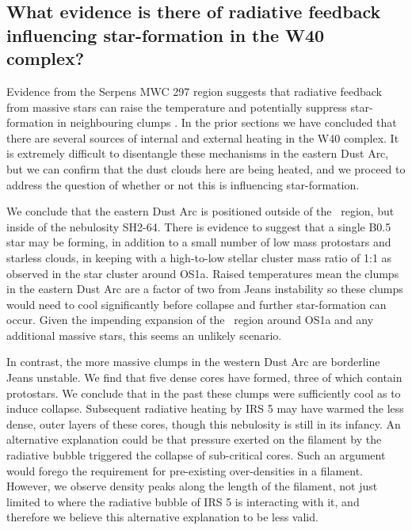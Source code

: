 \subsection{What evidence is there of radiative feedback influencing star-formation in the W40 complex?}

Evidence from the Serpens MWC 297 region suggests that radiative feedback from massive 
stars can raise the temperature and potentially suppress star-formation in neighbouring clumps 
\citep{Rumble:2015vn}. In the prior sections we have concluded that there are several sources 
of internal and external heating in the W40 complex. It is extremely difficult to disentangle these 
mechanisms in the eastern Dust Arc, but we can confirm that the dust clouds here are being 
heated, and we proceed to address the question of whether or not this is influencing star-formation. 

We conclude that the eastern Dust Arc is positioned outside of the \HII\ region, but inside of the 
nebulosity SH2-64. There is evidence to suggest that a single B0.5 star may be forming, 
in addition to a small number of low mass protostars and starless clouds, in keeping with a 
high-to-low stellar cluster mass ratio of 1:1 as observed in the star cluster around OS1a. Raised 
temperatures mean the clumps in the eastern Dust Arc are a factor of two from Jeans instability so 
these clumps would need to cool significantly before collapse and further star-formation can occur. 
Given the impending expansion of the \HII\ region around OS1a and any additional massive stars, 
this seems an unlikely scenario.

In contrast, the more massive clumps in the western Dust Arc are borderline Jeans unstable. We 
find that five dense cores have formed, three of which contain protostars. We conclude that in the 
past these clumps were sufficiently cool as to induce collapse. Subsequent radiative heating by 
IRS 5 may have warmed the less dense, outer layers of these cores, though this nebulosity is still 
in its infancy. An alternative explanation could be that pressure exerted on the filament by the 
radiative bubble triggered the collapse of sub-critical cores. Such an argument would forego 
the requirement for pre-existing over-densities in a filament. However, we observe density peaks 
along the length of the filament, not just limited to where the radiative bubble of IRS 5 is interacting 
with it, and therefore we believe this alternative explanation to be less valid.

